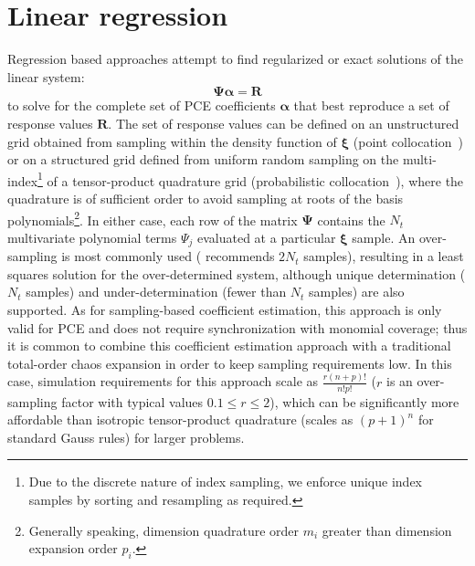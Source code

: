 \section{Linear regression} \label{uq:expansion:regress}

Regression based approaches attempt to find regularized or exact
solutions of the linear system:
\begin{equation}
\boldsymbol{\Psi} \boldsymbol{\alpha} = \boldsymbol{R} \label{eq:regression}
\end{equation}
to solve for the complete set of PCE coefficients
$\boldsymbol{\alpha}$ that best reproduce a set of response values
$\boldsymbol{R}$.  The set of response values can be defined on an
unstructured grid obtained from sampling within the density function
of $\boldsymbol{\xi}$ (point collocation~\cite{pt_colloc1,pt_colloc2})
or on a structured grid defined from uniform random sampling on the
multi-index\footnote{Due to the discrete nature of index sampling, we
  enforce unique index samples by sorting and resampling as required.}
of a tensor-product quadrature grid (probabilistic
collocation~\cite{Tat95}), where the quadrature is of sufficient order
to avoid sampling at roots of the basis polynomials\footnote{Generally
  speaking, dimension quadrature order $m_i$ greater than dimension
  expansion order $p_i$.}.  In either case, each row of the matrix
$\boldsymbol{\Psi}$ contains the $N_t$ multivariate polynomial terms
$\Psi_j$ evaluated at a particular $\boldsymbol{\xi}$ sample.  An
over-sampling is most commonly used (\cite{pt_colloc2} recommends
$2N_t$ samples), resulting in a least squares solution for the
over-determined system, although unique determination ($N_t$ samples)
and under-determination (fewer than $N_t$ samples) are also supported.
As for sampling-based coefficient estimation, this approach is only
valid for PCE and does not require synchronization with monomial
coverage; thus it is common to combine this coefficient estimation
approach with a traditional total-order chaos expansion in order to
keep sampling requirements low.  In this case, simulation requirements
for this approach scale as $\frac{r(n+p)!}{n!p!}$ ($r$ is an
over-sampling factor with typical values $0.1 \leq r \leq 2$), which
can be significantly more affordable than isotropic tensor-product
quadrature (scales as $(p+1)^n$ for standard Gauss rules) for larger
problems.
